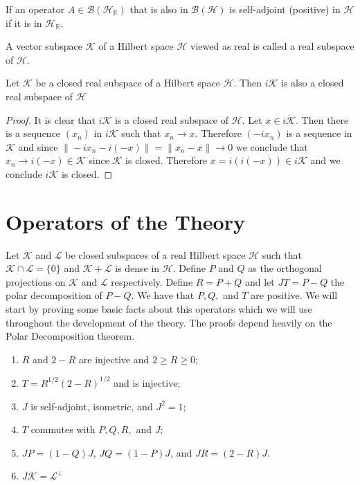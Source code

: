 \begin{theorem}
If an operator $A\in\mathcal{B}(\mathcal{H}_\mathbb{R})$ that is also in $\mathcal{B}(\mathcal{H})$ is self-adjoint (positive) in $\mathcal{H}$ if it is in $\mathcal{H}_\mathbb{R}$.
\end{theorem}

\begin{definition}
A vector subspace $\mathcal{K}$ of a Hilbert space $\mathcal{H}$ viewed as real is called a real subspace of $\mathcal{H}$.
\end{definition}

\begin{theorem}
Let $\mathcal{K}$ be a closed real subspace of a Hilbert space $\mathcal{H}$. Then $i\mathcal{K}$ is also a closed real subspace of $\mathcal{H}$
\end{theorem} 

\begin{proof}
It is clear that $i\mathcal{K}$ is a closed real subspace of $\mathcal{H}$. Let $x\in\overline{i\mathcal{K}}$. Then there is a sequence $(x_n)$ in $i\mathcal{K}$ such that $x_n\rightarrow x$. Therefore $(-ix_n)$ is a sequence in $\mathcal{K}$ and since $\|-ix_n-i(-x)\|=\|x_n-x\|\rightarrow 0$ we conclude that $x_n\rightarrow i(-x)\in\mathcal{K}$ since $\mathcal{K}$ is closed. Therefore $x=i(i(-x))\in i\mathcal{K}$ and we conclude $i\mathcal{K}$ is closed.  
\end{proof}

\section{Operators of the Theory}

Let $\mathcal{K}$ and $\mathcal{L}$ be closed subspaces of a real Hilbert space $\mathcal{H}$ such that $\mathcal{K}\cap\mathcal{L}=\{0\}$ and $\mathcal{K}+\mathcal{L}$ is dense in $\mathcal{H}$. Define $P$ and $Q$ as the orthogonal projections on $\mathcal{K}$ and $\mathcal{L}$ respectively. Define $R=P+Q$ and let $JT=P-Q$ the polar decomposition of $P-Q$. We have that $P,Q,$ and $T$ are positive. We will start by proving some basic facts about this operators which we will use throughout the development of the theory. The proofs depend heavily on the Polar Decomposition theorem.

\begin{theorem}
\begin{enumerate}
\item $R$ and $2-R$ are injective and $2\geq R \geq 0$;
\item $T=R^{1/2}(2-R)^{1/2}$ and is injective;
\item $J$ is self-adjoint, isometric, and $J^2=1$;
\item $T$ commutes with $P,Q,R,$ and $J$;
\item $JP=(1-Q)J$, $JQ=(1-P)J$, and $JR=(2-R)J$.
\item $J\mathcal{K}=\mathcal{L}^\bot$
\end{enumerate}
\end{theorem}

